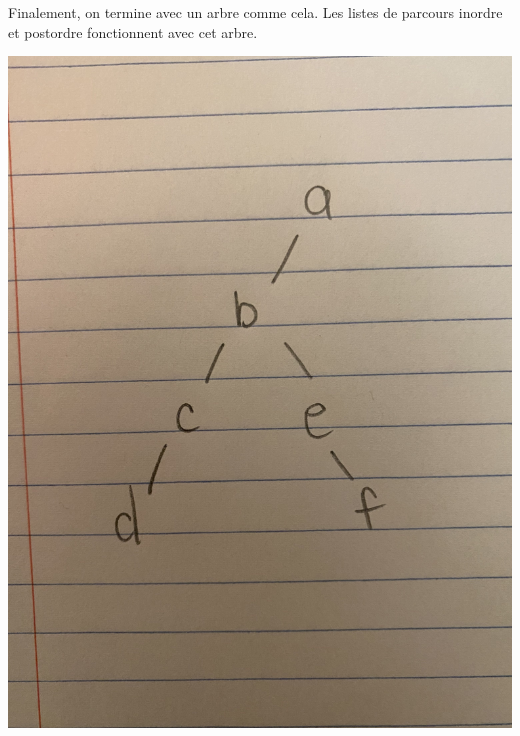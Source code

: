 \documentclass[12pt]{book}
\begin{document}
\begin{enumerate}
\begin{enumerate}
        Finalement, on termine avec un arbre comme cela. Les listes de parcours inordre et postordre fonctionnent avec cet arbre.
        
        \includegraphics[scale=0.05]{csi2510lab3q2c3.png}\\
        
        
        
        
    \end{enumerate}
    
    
\end{enumerate}
\end{document}
